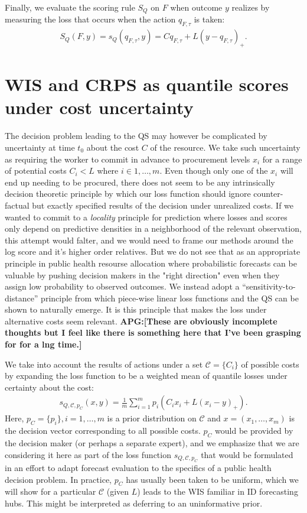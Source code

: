 \documentclass{article}
\def\apg#1{{\color{red}\textbf{APG:[#1]}}}
\begin{document}
Finally, we evaluate the scoring rule $S_Q$ on $F$ when outcome $y$ realizes by measuring the loss that occurs when the action $q_{F,\tau}$ is taken:
\begin{align}
S_Q(F,y) = s_Q(q_{F,\tau}, y) = Cq_{F,\tau} + L(y- q_{F,\tau})_{+}.
\end{align}


\section{WIS and CRPS as quantile scores under cost uncertainty}

The decision problem leading to the QS may however be complicated by uncertainty at time $t_0$ about the cost $C$ of the resource. We take such uncertainty as requiring the worker to commit in advance to procurement levels $x_i$ for a range of potential costs $C_i < L$ where $i \in 1, \ldots, m$.  Even though only one of the $x_i$ will end up needing to be procured, there does not seem to be any intrinsically decision theoretic principle by which our loss function should ignore counter-factual but exactly specified results of the decision under unrealized costs. If we wanted to commit to a \emph{locality} principle for prediction where losses and scores only depend on predictive densities in a neighborhood of the relevant observation, this attempt would falter, and we would need to frame our methods around the log score and it's higher order relatives. But we do not see that as an appropriate principle in public health resourse allocation where  
probabilistic forecasts can be valuable by pushing decision makers in the "right direction" even when they assign low probability to observed outcomes. We instead adopt a ``sensitivity-to-distance'' principle from which piece-wise linear loss functions and the QS can be shown to naturally emerge. It is this principle that makes the loss under alternative costs seem relevant. \apg{These are obviously incomplete thoughts but I feel like there is something here that I've been grasping for for a lng time.}

We take into account the results of actions under a set $\mathcal{C} = \{C_i\}$ of possible costs by expanding the loss function to be a weighted mean of quantile losses under certainty about the cost:
\begin{align}
s_{Q,\mathcal{C}, p_C}(x,y) = \frac{1}{m}\sum_{i=1}^{m}p_i(C_ix_i + L(x_i - y)_+). \label{eqn:sum_CL_loss}
\end{align}
Here, $p_C = \{p_i\}, i = 1,\ldots,m$ is a prior distribution on $\mathcal{C}$ and $x = (x_1,\ldots,x_m)$ is the decision vector corresponding to all possible costs.  $p_C$ would be provided by the decision maker (or perhaps a separate expert), and we emphasize that we are considering it here as part of the loss function $s_{Q,\mathcal{C}, p_C}$ that would be formulated in an effort to adapt forecast evaluation to the specifics of a public health decision problem. In practice, $p_C$ has usually been taken to be uniform, which we will show for a particular $\mathcal{C}$ (given $L$) leads to the WIS familiar in ID forecasting hubs. This might be interpreted as deferring to an uninformative prior. 
\end{document}
